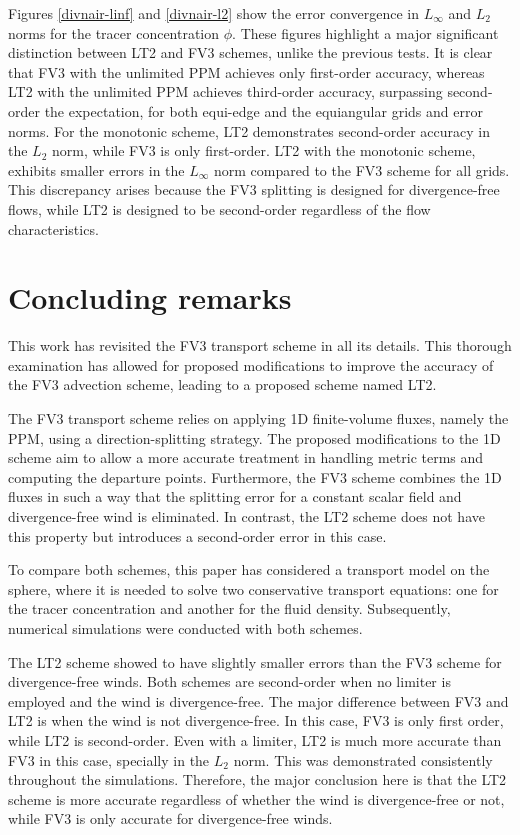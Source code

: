 \documentclass[preprint,12pt]{elsarticle}
\begin{document}
\begin{linenumbers}
Figures \ref{divnair-linf} and \ref{divnair-l2} show the error convergence in $L_{\infty}$ and $L_{2}$ norms for the tracer concentration $\phi$.
These figures highlight a major significant distinction between LT2 and FV3 schemes, unlike the previous tests.
It is clear that FV3 with the unlimited PPM achieves only first-order accuracy, whereas LT2 with the unlimited PPM achieves third-order accuracy, 
surpassing second-order the expectation, for both equi-edge and the equiangular grids and error norms.
For the monotonic scheme, LT2 demonstrates second-order accuracy in the $L_2$ norm, while FV3 is only first-order.
LT2 with the monotonic scheme, exhibits smaller errors in the $L_{\infty}$ norm compared to the FV3 scheme for all grids.
This discrepancy arises because the FV3 splitting is designed for divergence-free flows, while LT2 is designed to be second-order regardless of the flow characteristics.

\section{Concluding remarks}
\label{conclusion}
This work has revisited the FV3 transport scheme in all its details. This thorough examination has allowed for proposed modifications to improve the accuracy of the FV3 advection scheme, leading to a proposed scheme named LT2.

The FV3 transport scheme relies on applying 1D finite-volume fluxes, namely the PPM, using a direction-splitting strategy.
The proposed modifications to the 1D scheme aim to allow a more accurate treatment in handling metric terms and computing the departure points.
Furthermore, the FV3 scheme combines the 1D fluxes in such a way that the splitting error for a constant scalar field and divergence-free wind is eliminated.
In contrast, the LT2 scheme does not have this property but introduces a second-order error in this case.

To compare both schemes, this paper has considered a transport model on the sphere, where it is needed to solve two conservative transport equations: one for the tracer concentration and another for the fluid density. 
Subsequently, numerical simulations were conducted with both schemes.

The LT2 scheme showed to  have slightly smaller errors than the FV3 scheme for divergence-free winds.
Both schemes are second-order when no limiter is employed and the wind is divergence-free.
The major difference between FV3 and LT2 is when the wind is not divergence-free.
In this case, FV3 is only first order, while LT2 is second-order. Even with a limiter, LT2 is much more accurate than FV3 in this case, specially in the $L_2$ norm.
This was demonstrated consistently throughout the simulations.
Therefore, the major conclusion here is that the LT2 scheme is more accurate regardless of whether the wind is divergence-free or not, while FV3 is only accurate for divergence-free winds.


\end{linenumbers}
\end{document}
